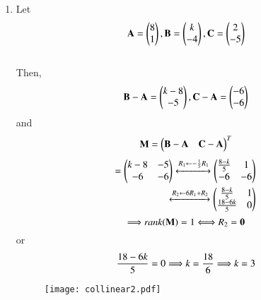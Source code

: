 \documentclass[journal,12pt,twocolumn]{IEEEtran}
\renewcommand\thesection{\arabic{section}}
\begin{document}
\begin{enumerate}[label=\thesection.\arabic*.,ref=\thesection.\theenumi]
\begin{enumerate}
 \item Let
    \begin{align}
        \vec{A}=\myvec{8\\1}, \vec{B}=\myvec{\emph{k}\\-4}, \vec{C}=\myvec{2\\-5}
    \end{align}\\
    Then,
    \begin{align}
        \vec{B}-\vec{A}=\myvec{\emph{k}-8\\-5}, \vec{C}-\vec{A}=\myvec{-6\\-6}
    \end{align}
    and
    \begin{align}
     \vec{M}=\myvec{\vec{B}-\vec{A}&\vec{C}-\vec{A}}^T\end{align}
     \begin{align}
         =\myvec{\emph{k}-8 & -5\\-6 & -6} \xleftrightarrow{R_1 \leftarrow -\frac{1}{5}R_1}
     \myvec{\frac{8-\emph{k}}{5}&1\\-6&-6}\\
     \xleftrightarrow{R_2 \leftarrow 6R_1+R_2  }\myvec{\frac{8-\emph{k}}{5}& 1\\\frac{18-6\emph{k}}{5} & 0}
     \end{align}
         \[\Longrightarrow \emph{rank}(\vec{M})=1 \Longleftrightarrow R_2 = \vec{0}\]
         or \[\frac{18-6\emph{k}}{5} = 0 \Longrightarrow \emph{k}=\frac{18}{6} \Longrightarrow \emph{k}=3\]
         \begin{figure}[h]
\centering
\texttt{[image: collinear2.pdf]}
\label{Fig 1.2}
\end{figure}
\end{enumerate}
\end{enumerate}
\end{document}
